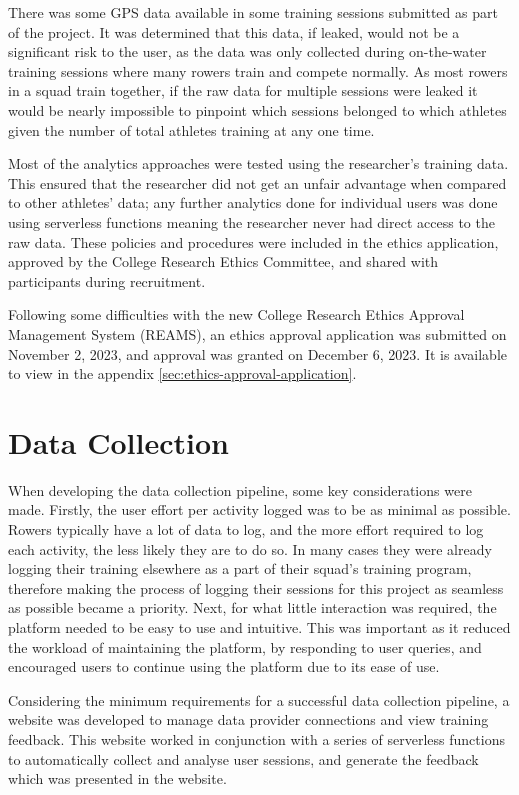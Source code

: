 There was some GPS data available in some training sessions submitted as part of the project. It was determined that this data, if leaked, would not be a significant risk to the user, as the data was only collected during on-the-water training sessions where many rowers train and compete normally. As most rowers in a squad train together, if the raw data for multiple sessions were leaked it would be nearly impossible to pinpoint which sessions belonged to which athletes given the number of total athletes training at any one time. 

Most of the analytics approaches were tested using the researcher's training data. This ensured that the researcher did not get an unfair advantage when compared to other athletes' data; any further analytics done for individual users was done using serverless functions meaning the researcher never had direct access to the raw data. These policies and procedures were included in the ethics application, approved by the College Research Ethics Committee, and shared with participants during recruitment. 

Following some difficulties with the new College Research Ethics Approval Management System (REAMS), an ethics approval application was submitted on November 2, 2023, and approval was granted on December 6, 2023. It is available to view in the appendix \ref{sec:ethics-approval-application}.

\section{Data Collection}
When developing the data collection pipeline, some key considerations were made. Firstly, the user effort per activity logged was to be as minimal as possible. Rowers typically have a lot of data to log, and the more effort required to log each activity, the less likely they are to do so. In many cases they were already logging their training elsewhere as a part of their squad's training program, therefore making the process of logging their sessions for this project as seamless as possible became a priority. Next, for what little interaction was required, the platform needed to be easy to use and intuitive. This was important as it reduced the workload of maintaining the platform, by responding to user queries, and encouraged users to continue using the platform due to its ease of use.

Considering the minimum requirements for a successful data collection pipeline, a website was developed to manage data provider connections and view training feedback. This website worked in conjunction with a series of serverless functions to automatically collect and analyse user sessions, and generate the feedback which was presented in the website.


